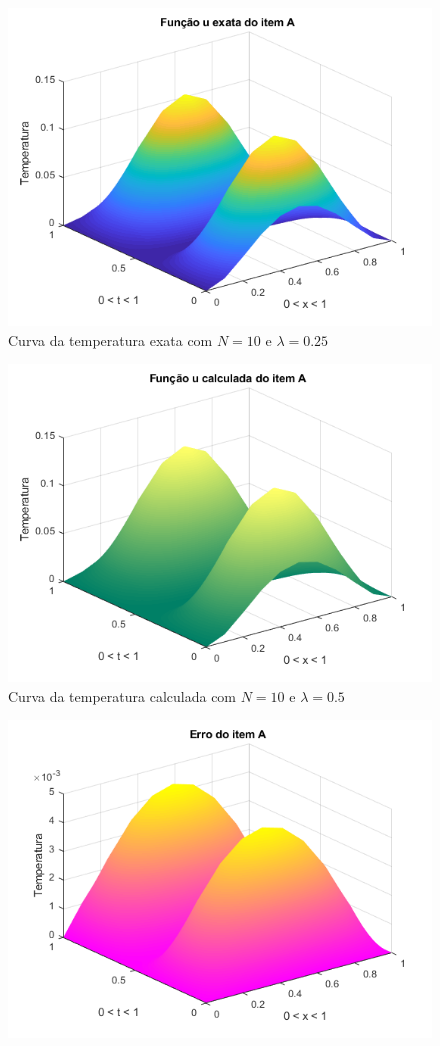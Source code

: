\documentclass[12pt]{article}
\begin{document}
\begin{spacing}{1.5}
\begin{figure}[ht]
    \centering
    \includegraphics[width=0.8\linewidth]{Primeira_Tarefa/ItemA/n10_lambda0-25_exata.png}
    \caption{Curva da temperatura exata com $N=10$ e $\lambda=0.25$}
    \label{fig:A_n10lambda0-25_exata}
\end{figure}
\begin{figure}
    \centering
    \includegraphics[width=0.8\linewidth]{Primeira_Tarefa/ItemA/n10_lambda0-25_calc.png}
    \caption{Curva da temperatura calculada com $N=10$ e $\lambda=0.5$}
    \label{fig:A_n10lambda0-25_calc}
\end{figure}
\begin{figure}
    \centering
    \includegraphics[width=0.8\linewidth]{Primeira_Tarefa/ItemA/n10_lambda0-25_erro.png}

\end{figure}
\end{spacing}
\end{document}
